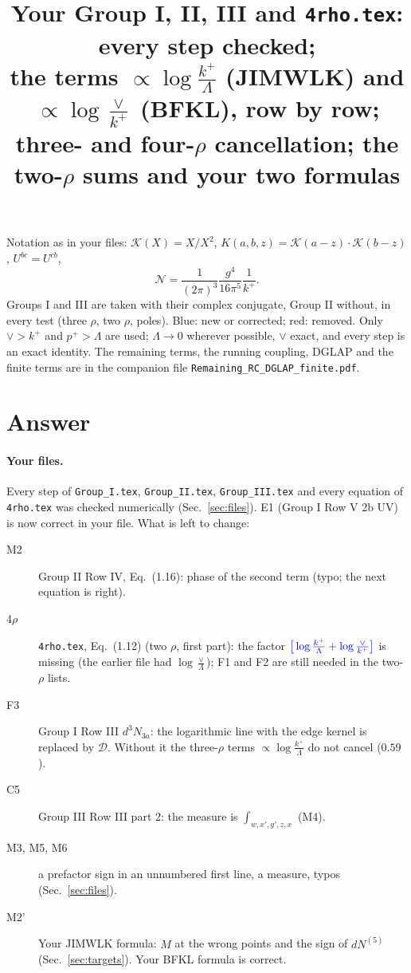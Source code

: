 \documentclass[10pt]{article}
\title{Your Group I, II, III and \texttt{4rho.tex}: every step checked;\\ the terms $\propto\log\frac{k^+}{\Lambda}$ (JIMWLK) and $\propto\log\frac{\vee}{k^+}$ (BFKL), row by row;\\ three- and four-$\rho$ cancellation; the two-$\rho$ sums and your two formulas}
\date{}
\numberwithin{equation}{section}
\newcommand{\new}[1]{{\color{blue}#1}}
\newcommand{\old}[1]{{\color{red}#1}}
\begin{document}
\maketitle
\noindent Notation as in your files: $\mathcal K(X)=X/X^2$, $K(a,b,z)=\mathcal K(a-z)\cdot\mathcal K(b-z)$, $U^{bc}=U^{cb}$,
\begin{equation*}
\mathcal N=\frac{1}{(2\pi)^3}\frac{g^4}{16\pi^5}\frac{1}{k^+}.
\end{equation*}
Groups I and III are taken with their complex conjugate, Group II without, in every test (three $\rho$, two $\rho$, poles). \new{Blue}: new or corrected; \old{red}: removed. Only $\vee>k^+$ and $p^+>\Lambda$ are used; $\Lambda\to0$ wherever possible, $\vee$ exact, and every step is an exact identity. The remaining terms, the running coupling, DGLAP and the finite terms are in the companion file \texttt{Remaining\_RC\_DGLAP\_finite.pdf}.

\section{Answer}\label{sec:answer}
\paragraph{Your files.} Every step of \texttt{Group\_I.tex}, \texttt{Group\_II.tex}, \texttt{Group\_III.tex} and every equation of \texttt{4rho.tex} was checked numerically (Sec.~\ref{sec:files}). E1 (Group I Row V 2b UV) is now correct in your file. What is left to change:
\begin{description}
\item[M2] Group II Row IV, Eq.~(1.16): phase of the second term (typo; the next equation is right).
\item[4$\rho$] \texttt{4rho.tex}, Eq.~(1.12) (two $\rho$, first part): the factor $\new{\big[\log\frac{k^+}{\Lambda}+\log\frac{\vee}{k^+}\big]}$ is missing (the earlier file had $\log\frac{\vee}{\Lambda}$); F1 and F2 are still needed in the two-$\rho$ lists.
\item[F3] Group I Row III $d^3N_{3a}$: the logarithmic line with the edge kernel is replaced by $\mathcal D$. Without it the three-$\rho$ terms $\propto\log\frac{k^+}{\Lambda}$ do not cancel ($0.59$).
\item[C5] Group III Row III part 2: the measure is $\int_{w,x',y',z,x}$ (M4).
\item[M3, M5, M6] a prefactor sign in an unnumbered first line, a measure, typos (Sec.~\ref{sec:files}).
\item[M2'] Your JIMWLK formula: $M$ at the wrong points and the sign of $dN^{(5)}$ (Sec.~\ref{sec:targets}). Your BFKL formula is correct.
\end{description}
\end{document}
